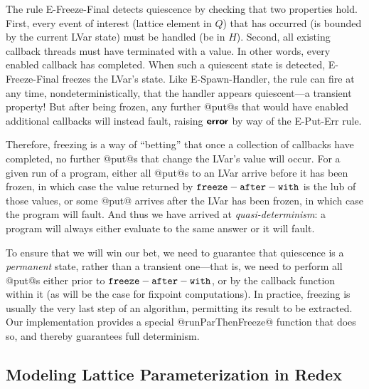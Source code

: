 The rule {\sc E-Freeze-Final} detects quiescence by checking that two
properties hold.  First, every event of interest (lattice element in
$Q$) that has occurred (is bounded by the current LVar state) must be
handled (be in $H$).  Second, all existing callback threads must have
terminated with a value.  In other words, every enabled callback has
completed.  When such a quiescent state is detected, {\sc
  E-Freeze-Final} freezes the LVar's state.  Like {\sc
  E-Spawn-Handler}, the rule can fire at any time,
nondeterministically, that the handler appears quiescent---a transient
property!  But after being frozen, any further @put@s that would have
enabled additional callbacks will instead fault, raising $\textbf{\textsf{error}}$ by
way of the {\sc E-Put-Err} rule.  

Therefore, freezing is a way of ``betting'' that once a collection of
callbacks have completed, no further @put@s that change the LVar's
value will occur.  For a given run of a program, either all @put@s to
an LVar arrive before it has been frozen, in which case the value
returned by ${\mbox{\texttt{freeze}}-\mbox{\texttt{after}}-\mbox{\texttt{with}}}$ is the lub of those values, or some @put@ arrives
after the LVar has been frozen, in which case the program will fault.
And thus we have arrived at \emph{quasi-determinism}: a program will
always either evaluate to the same answer or it will fault.

To ensure that we will win our bet, we need to guarantee that
quiescence is a \emph{permanent} state, rather than a transient
one---that is, we need to perform all @put@s either prior to ${\mbox{\texttt{freeze}}-\mbox{\texttt{after}}-\mbox{\texttt{with}}}$,
or by the callback function within it (as will be the case for
fixpoint computations).  In practice, freezing is usually the very
last step of an algorithm, permitting its result to be extracted. Our
implementation provides a special @runParThenFreeze@ function that
does so, and thereby guarantees full determinism.


\subsection{Modeling Lattice Parameterization in Redex}\label{subsection:redex}

